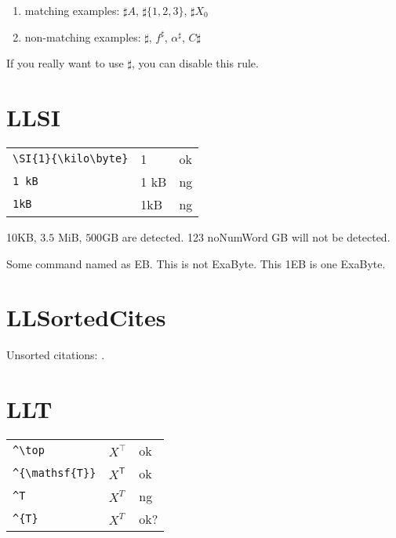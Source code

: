 \documentclass[a4paper]{article}
\newcommand{\tA}[1]{\textcolor{cA}{#1}}
\newcommand{\tC}[1]{\textcolor{cC}{#1}}
\newcommand{\tD}[1]{\textcolor{cD}{#1}}
\begin{document}
\begin{enumerate}[label=\textbullet]
	\item matching examples: $\sharp A$, $\sharp \{1,2,3\}$, $\sharp X_{0}$
	\item non-matching examples: ${\sharp}$, $f^\sharp$, $\alpha^\sharp$, $C\sharp$
\end{enumerate}

If you really want to use $\sharp$, you can disable this rule.

\section{LLSI}

\begin{table}[H]
	\centering
	\begin{tabular}{lll}
		\verb|\SI{1}{\kilo\byte}| & \SI{1}{\kilo\byte} & \tA{ok} \\
		\verb|1 kB|               & 1 kB               & \tD{ng} \\
		\verb|1kB|                & 1kB                & \tD{ng} \\
	\end{tabular}
\end{table}

\newcommand{\EB}{Some command named as EB}

10KB, $3.5$ MiB, $500 \mathrm{GB}$ are detected. 123 noNumWord GB will not be detected.

\EB. This is not ExaByte. This 1EB is one ExaByte.

\section{LLSortedCites}

Unsorted citations: \cite{hari2000,boli2000}.

\section{LLT}

\begin{table}[H]
	\centering
	\begin{tabular}{lll}
		\verb|^\top|         & $X^\top$         & \tA{ok}  \\
		\verb|^{\mathsf{T}}| & $X^{\mathsf{T}}$ & \tA{ok}  \\
		\verb|^T|            & $X^T$            & \tD{ng}  \\
		\verb|^{T}|          & $X^{T}$          & \tC{ok?} \\
	\end{tabular}
\end{table}
\end{document}
